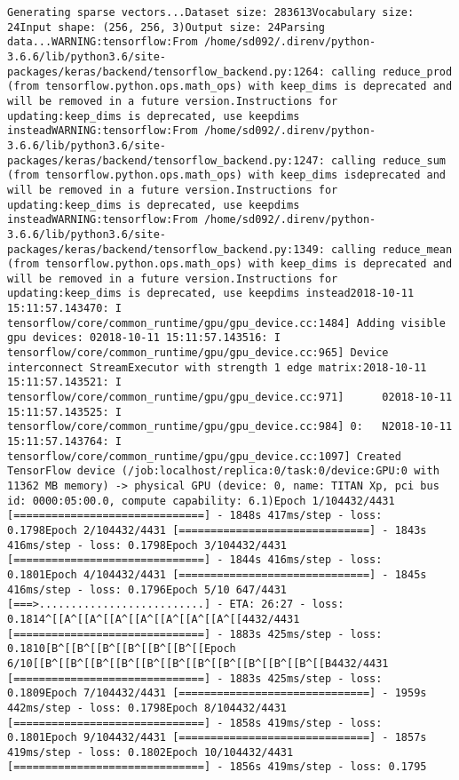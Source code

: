 \documentclass[pdftex,a4paper,halfparskip]{scrartcl}
\begin{document}
\begin{verbatim}
Generating sparse vectors...Dataset size: 283613Vocabulary size: 24Input shape: (256, 256, 3)Output size: 24Parsing data...WARNING:tensorflow:From /home/sd092/.direnv/python-3.6.6/lib/python3.6/site-packages/keras/backend/tensorflow_backend.py:1264: calling reduce_prod (from tensorflow.python.ops.math_ops) with keep_dims is deprecated and will be removed in a future version.Instructions for updating:keep_dims is deprecated, use keepdims insteadWARNING:tensorflow:From /home/sd092/.direnv/python-3.6.6/lib/python3.6/site-packages/keras/backend/tensorflow_backend.py:1247: calling reduce_sum (from tensorflow.python.ops.math_ops) with keep_dims isdeprecated and will be removed in a future version.Instructions for updating:keep_dims is deprecated, use keepdims insteadWARNING:tensorflow:From /home/sd092/.direnv/python-3.6.6/lib/python3.6/site-packages/keras/backend/tensorflow_backend.py:1349: calling reduce_mean (from tensorflow.python.ops.math_ops) with keep_dims is deprecated and will be removed in a future version.Instructions for updating:keep_dims is deprecated, use keepdims instead2018-10-11 15:11:57.143470: I tensorflow/core/common_runtime/gpu/gpu_device.cc:1484] Adding visible gpu devices: 02018-10-11 15:11:57.143516: I tensorflow/core/common_runtime/gpu/gpu_device.cc:965] Device interconnect StreamExecutor with strength 1 edge matrix:2018-10-11 15:11:57.143521: I tensorflow/core/common_runtime/gpu/gpu_device.cc:971]      02018-10-11 15:11:57.143525: I tensorflow/core/common_runtime/gpu/gpu_device.cc:984] 0:   N2018-10-11 15:11:57.143764: I tensorflow/core/common_runtime/gpu/gpu_device.cc:1097] Created TensorFlow device (/job:localhost/replica:0/task:0/device:GPU:0 with 11362 MB memory) -> physical GPU (device: 0, name: TITAN Xp, pci bus id: 0000:05:00.0, compute capability: 6.1)Epoch 1/104432/4431 [==============================] - 1848s 417ms/step - loss: 0.1798Epoch 2/104432/4431 [==============================] - 1843s 416ms/step - loss: 0.1798Epoch 3/104432/4431 [==============================] - 1844s 416ms/step - loss: 0.1801Epoch 4/104432/4431 [==============================] - 1845s 416ms/step - loss: 0.1796Epoch 5/10 647/4431 [===>..........................] - ETA: 26:27 - loss: 0.1814^[[A^[[A^[[A^[[A^[[A^[[A^[[A^[[4432/4431 [==============================] - 1883s 425ms/step - loss: 0.1810[B^[[B^[[B^[[B^[[B^[[B^[[Epoch 6/10[[B^[[B^[[B^[[B^[[B^[[B^[[B^[[B^[[B^[[B^[[B^[[B4432/4431 [==============================] - 1883s 425ms/step - loss: 0.1809Epoch 7/104432/4431 [==============================] - 1959s 442ms/step - loss: 0.1798Epoch 8/104432/4431 [==============================] - 1858s 419ms/step - loss: 0.1801Epoch 9/104432/4431 [==============================] - 1857s 419ms/step - loss: 0.1802Epoch 10/104432/4431 [==============================] - 1856s 419ms/step - loss: 0.1795
\end{verbatim}
\end{document}
